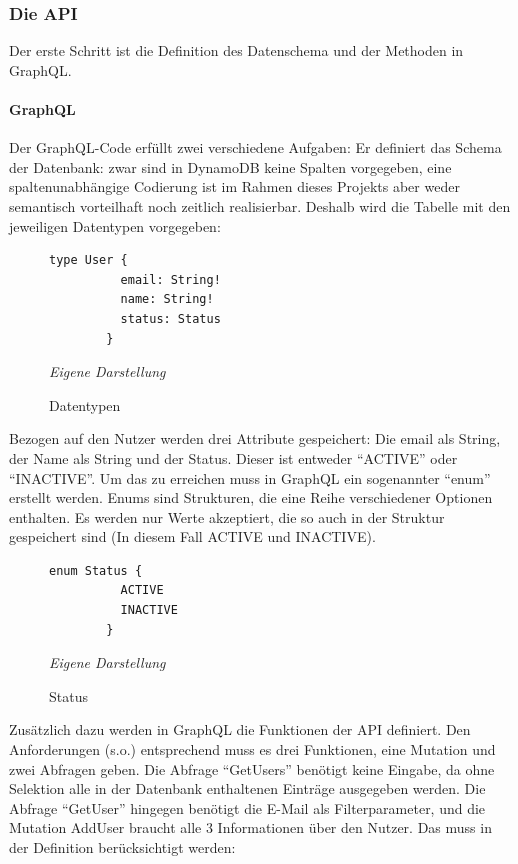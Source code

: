 	\subsubsection{Die API}
	Der erste Schritt ist die Definition des Datenschema und der Methoden in GraphQL.
	\paragraph{GraphQL}
	Der GraphQL-Code erfüllt zwei verschiedene Aufgaben: \cite{GraphQL2024} Er definiert das Schema der Datenbank: zwar sind in DynamoDB keine Spalten vorgegeben, eine spaltenunabhängige Codierung ist im Rahmen dieses Projekts aber weder semantisch vorteilhaft noch zeitlich realisierbar. Deshalb wird die Tabelle mit den jeweiligen Datentypen vorgegeben:
	
		\begin{figure}[H]
		\centering
		\begin{minipage}[t]{.7\textwidth} %
		\caption{Datentypen} %
		\begin{lstlisting}[style=graphql]
		type User {
		  email: String!
		  name: String!
		  status: Status
		}
		\end{lstlisting}
		\textit{Eigene Darstellung} %
		\label{fig:datenTypen}
		\end{minipage}
		\end{figure}
	Bezogen auf den Nutzer werden drei Attribute gespeichert: Die email als String, der Name als String und der Status. Dieser ist entweder ``ACTIVE'' oder ``INACTIVE''. Um das zu erreichen muss in GraphQL ein sogenannter ``enum'' erstellt werden. Enums sind Strukturen, die eine Reihe verschiedener Optionen enthalten. Es werden nur Werte akzeptiert, die so auch in der Struktur gespeichert sind (In diesem Fall ACTIVE und INACTIVE). \cite{https://graphql.com/learn/enums/}
	
		\begin{figure}[H]
		\centering
		\begin{minipage}[t]{.7\textwidth} %
		\caption{Status} %
		\begin{lstlisting}[style=graphql]
		enum Status {
		  ACTIVE
		  INACTIVE
		}
		\end{lstlisting}
		\textit{Eigene Darstellung} %
		\label{fig:status}
		\end{minipage}
		\end{figure}
	
	Zusätzlich dazu werden in GraphQL die Funktionen der API definiert. Den Anforderungen (s.o.) entsprechend muss es drei Funktionen, eine Mutation und zwei Abfragen geben. Die Abfrage ``GetUsers'' benötigt keine Eingabe, da ohne Selektion alle in der Datenbank enthaltenen Einträge ausgegeben werden. Die Abfrage ``GetUser'' hingegen benötigt die E-Mail als Filterparameter, und die Mutation AddUser braucht alle 3 Informationen über den Nutzer. Das muss in der Definition berücksichtigt werden:
	
